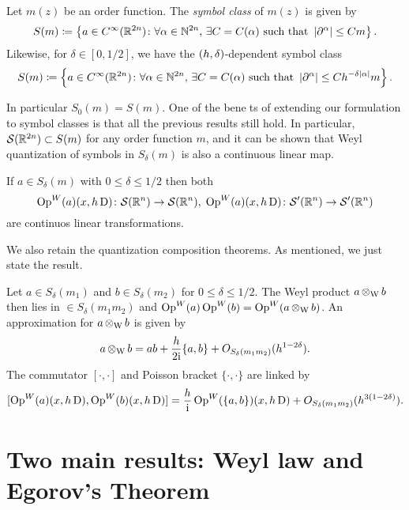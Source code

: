 \begin{defin}
\label{def:symbol_class}
Let $m(z)$ be an order function. The \emph{symbol class} of $m(z)$ is given by 
\[
S(m)\coloneqq \left\{
a\in C^{\infty}(\mathbb{R}^{2n})\colon\forall\alpha\in\mathbb{N}^{2n},\,\exists C = C(\alpha)\text{ such that }\left| \partial^{\alpha}\right|\leq Cm
\right\}.
\]
Likewise, for $\delta\in[0,1/2]$, we have the $(h,\delta)$-dependent symbol class
\[
S(m)\coloneqq \left\{
a\in C^{\infty}(\mathbb{R}^{2n})\colon\forall\alpha\in\mathbb{N}^{2n},\,\exists C = C(\alpha)\text{ such that }\left| \partial^{\alpha}\right|\leq Ch^{-\delta\left| \alpha\right|}m
\right\}.
\]
\end{defin}

In particular $S_{0}(m)=S(m)$. One of the benets of extending our formulation to symbol classes is that all the previous results still hold. In particular, $\mathcal{S}(\mathbb{R}^{2n})\subset S(m)$ for any order function $m$, and it can be shown that Weyl quantization of symbols in $S_{\delta}(m)$ is also a continuous linear map.

\begin{nteo}
\label{teo:prop_schwar_cont_class_symbols}
If $a\in S_{\delta}(m)$ with $0\leq \delta\leq 1/2$ then both
\[
\operatorname{Op}^{W}(a)(x,h\operatorname{D})\colon\mathcal{S}(\mathbb{R}^{n})\to\mathcal{S}(\mathbb{R}^{n}) ,\;
\operatorname{Op}^{W}(a)(x,h\operatorname{D})\colon\mathcal{S}'(\mathbb{R}^{n})\to\mathcal{S}'(\mathbb{R}^{n})
\]
are continuos linear transformations.
\end{nteo}

We also retain the quantization composition theorems. As mentioned, we just state the result.


\begin{nteo}
\label{teo:comp_symbol_class}
Let $a\in S_{\delta}(m_{1})$ and $b\in S_{\delta}(m_{2})$ for $0\leq\delta\leq 1/2$. The Weyl product $a\operatorname{\otimes_{W}} b$ then lies in $\in S_{\delta}(m_{1}m_{2})$ and $\operatorname{Op}^{W}(a)\operatorname{Op}^{W}(b)=\operatorname{Op}^{W}(a\operatorname{\otimes_{W}} b)$. An approximation for $a\operatorname{\otimes_{W}} b$ is given by
\[
a\operatorname{\otimes_{W}} b=ab+\frac{h}{2\mathrm{i}}\{a,b\}+O_{S_{\delta}(m_{1}m_{2})}(h^{1-2\delta}).
\]
The commutator $[\cdot,\cdot]$ and Poisson bracket $\{\cdot,\cdot\}$ are linked by
\[
[\operatorname{Op}^{W}(a)(x,h\operatorname{D}),\operatorname{Op}^{W}(b)(x,h\operatorname{D})]=\frac{h}{\mathrm{i}}\operatorname{Op}^{W}(\{a,b\})(x,h\operatorname{D})+O_{S_{\delta}(m_{1}m_{2})}(h^{3(1-2\delta)}).
\]
\end{nteo}




\section{Two main results: Weyl law and Egorov's Theorem}


